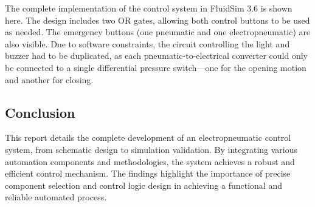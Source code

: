 The complete implementation of the control system in FluidSim 3.6 is shown here. The design includes two OR gates, 
allowing both control buttons to be used as needed. The emergency buttons (one pneumatic and one electropneumatic) 
are also visible. Due to software constraints, the circuit controlling the light and buzzer had to be duplicated, as 
each pneumatic-to-electrical converter could only be connected to a single differential pressure switch—one for the 
opening motion and another for closing.\\

\subsection{Conclusion}

This report details the complete development of an electropneumatic control system, from schematic 
design to simulation validation. By integrating various automation components and methodologies, 
the system achieves a robust and efficient control mechanism. The findings highlight the importance 
of precise component selection and control logic design in achieving a functional and reliable 
automated process.